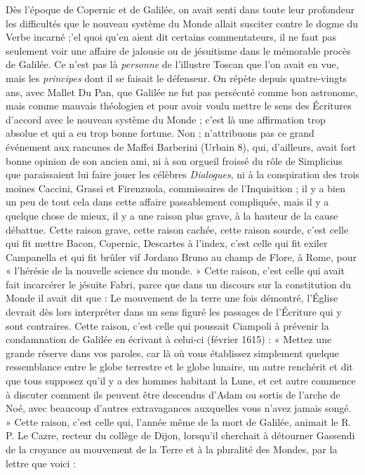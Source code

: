 \documentclass[a4paper, 11pt, oneside, landscape]{article}
\begin{document}
Dès l'époque de Copernic et de Galilée, on avait senti dans toute leur profondeur les difficultés que le nouveau système du Monde allait susciter contre le dogme du Verbe incarné ;'el quoi qu'en aient dit certains commentateurs, il ne faut pas seulement voir une affaire de jalousie ou de jésuitisme dans le mémorable procès de Galilée. Ce n'est pas là \emph{personne} de l'illustre Toscan que l'on avait en vue, mais les \emph{principes} dont il se faisait le défenseur. On répète depuis quatre-vingts ans, avec Mallet Du Pan, que Galilée ne fut pas persécuté comme bon astronome, mais comme mauvais théologien et pour avoir voulu mettre le sens des Écritures d'accord avec le nouveau système du Monde ; c'est là une affirmation trop absolue et qui a eu trop bonne fortune. Non ; n'attribuons pas ce grand événement aux rancunes de Maffei Barberini (Urbain 8), qui, d'ailleurs, avait fort bonne opinion de son ancien ami, ni à son orgueil froissé du rôle de Simplicius que paraissaient lui faire jouer les célèbres \emph{Dialogues}, ni à la conspiration des trois moines Caccini, Grassi et Firenzuola, commissaires de l'Inquisition ; il y a bien un peu de tout cela dans cette affaire passablement compliquée, mais il y a quelque chose de mieux, il y a une raison plus grave, à la hauteur de la cause débattue. Cette raison grave, cette raison cachée, cette raison sourde, c'est celle qui fit mettre Bacon, Copernic, Descartes à l'index, c'est celle qui fit exiler Campanella et qui fit brûler vif Jordano Bruno au champ de Flore, à Rome, pour « l'hérésie de la nouvelle science du monde. » Cette raison, c'est celle qui avait fait incarcérer le jésuite Fabri, parce que dans un discours sur la constitution du Monde il avait dit que : Le mouvement de la terre une fois démontré, l'Église devrait dès lors interpréter dans un sens figuré les passages de l'Écriture qui y sont contraires. Cette raison, c'est celle qui poussait Ciampoli à prévenir la condamnation de Galilée en écrivant à celui-ci (février 1615) : « Mettez une grande réserve dans vos paroles, car là où vous établissez simplement quelque ressemblance entre le globe terrestre et le globe lunaire, un autre renchérit et dit que tous supposez qu'il y a des hommes habitant la Lune, et cet autre commence à discuter comment ils peuvent être descendus d'Adam ou sortis de l'arche de Noé, avec beaucoup d'autres extravagances auxquelles vous n'avez jamais songé. » Cette raison, c'est celle qui, l'année même de la mort de Galilée, animait le R. P. Le Cazre, recteur du collège de Dijon, lorsqu'il cherchait à détourner Gassendi de la croyance au mouvement de la Terre et à la pluralité des Mondes, par la lettre que voici :
\end{document}
